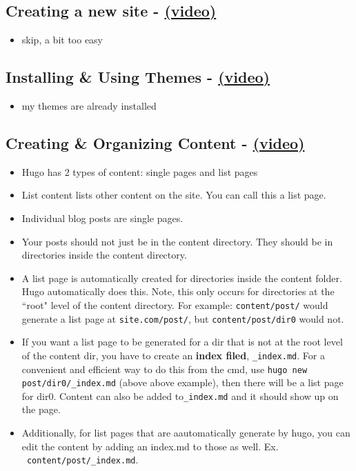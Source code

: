 \subsection{Creating a new site - \href{https://youtu.be/sB0HLHjgQ7E?list=PLLAZ4kZ9dFpOnyRlyS-liKL5ReHDcj4G3}{(video)} }
\begin{itemize}
\item skip, a bit too easy

\end{itemize}

\subsection{Installing \& Using Themes - \href{https://youtu.be/L34JL_3Jkyc?list=PLLAZ4kZ9dFpOnyRlyS-liKL5ReHDcj4G3}{(video)} }
\begin{itemize}
\item my themes are already installed
\end{itemize}

\subsection{Creating \& Organizing Content - \href{https://youtu.be/0GZxidrlaRM?list=PLLAZ4kZ9dFpOnyRlyS-liKL5ReHDcj4G3}{(video)} }
\begin{itemize}
\item
	Hugo has 2 types of content: single pages and list pages
\item
	List content lists other content on the site. You can call this a list page.
\item
	Individual blog posts are single pages.
\item
	Your posts should not just be in the content directory. They should be in directories inside the content directory.
\item
	A list page is automatically created for directories inside the content folder.  Hugo automatically does this. Note, this only occurs for directories at the ``root" level of the content directory. For example:  \texttt{content/post/} would generate a list page at \texttt{site.com/post/}, but \texttt{content/post/dir0} would not.
\item
	If you want a list page to be generated for a dir that is not at the root level of the content dir, you have to create an \textbf{index filed}, \texttt{\_index.md}. For a convenient and efficient way to do this from the cmd, use \texttt{hugo new post/dir0/\_index.md} (above above example), then there will be a list page for dir0. 	Content can also be added to\texttt{\_index.md} and it should show up on the page.
\item
	Additionally, for list pages that are aautomatically generate by hugo, you can edit the content by adding an index.md to those as well. Ex. \texttt{~content/post/\_index.md}.
\end{itemize}

